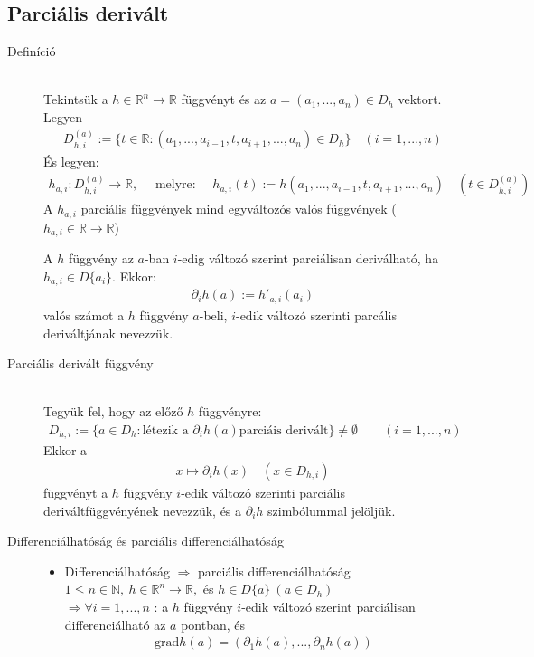 \documentclass[margin=0px]{article}
\newcommand{\R}{\mathbb{R}}
\begin{document}
\subsection{Parciális derivált}
\begin{description}
    \item[Definíció] \hfill \\
        Tekintsük a $ h \in \R^n \rightarrow \R $ függvényt és az $a = (a_1, ... , a_n) \in D_h $ vektort. Legyen
        \begin{align*}
            D_{h,i}^{(a)} := \{t \in \R : (a_1, ..., a_{i-1}, t, a_{i+1}, ..., a_n) \in D_h\} \quad (i = 1,...,n)
        \end{align*}
        És legyen:
        \begin{align*}
            h_{a,i} : D_{h,i}^{(a)} \rightarrow \R, \quad \textrm{ melyre: } \quad h_{a,i}(t) := h(a_1, ..., a_{i-1}, t, a_{i+1}, ..., a_n) \quad (t\in	D_{h,i}^{(a)} )
        \end{align*}
        A $h_{a,i}$ parciális függvények mind egyváltozós valós függvények ($h_{a,i} \in \R \rightarrow\R $)

        A $ h $ függvény az $a$-ban $i$-edig változó szerint parciálisan deriválható, ha $ h_{a,i} \in D\{a_i\} $. Ekkor:
        \begin{align*}
            \partial_ih(a) := h'_{a,i}(a_i)
        \end{align*}
        valós számot a $h$ függvény $a$-beli, $i$-edik változó szerinti parcális deriváltjának nevezzük.
    \item[Parciális derivált függvény] \hfill \\
        Tegyük fel, hogy az előző $h$ függvényre:
        \begin{align*}
            D_{h,i} := \{a \in D_h : \textrm{létezik a } \partial_ih(a) \textrm{parciáis derivált}\} \neq \emptyset \qquad (i=1,...,n)
        \end{align*}
        Ekkor a
        \begin{align*}
            x \mapsto \partial_ih(x) \quad (x\in D_{h,i})
        \end{align*}
        függvényt a $h$ függvény $i$-edik változó szerinti parciális deriváltfüggvényének nevezzük, és a $\partial_ih$ szimbólummal jelöljük.
    \item[Differenciálhatóság és parciális differenciálhatóság] \hfill
        \begin{itemize}
            \item Differenciálhatóság $\Rightarrow$ parciális differenciálhatóság \\
                  $ 1 \leq n \in \mathbb{N}, \ h \in \R^n \rightarrow \R, $ és $h\in D\{a\} \ (a \in D_h) $ \\
                  $\Rightarrow \forall i = 1,...,n$ : a $h$ függvény $i$-edik változó szerint parciálisan differenciálható az $a$ pontban, és
                  \begin{align*}
                      \textrm{grad}h(a) = (\partial_1h(a), ..., \partial_nh(a))
                  \end{align*}


\end{itemize}
\end{description}
\end{document}
